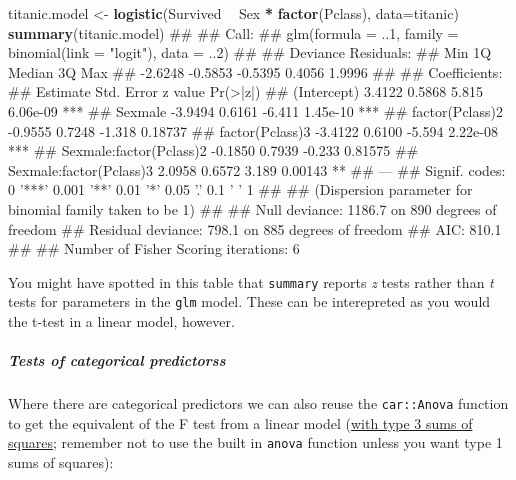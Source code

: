 \documentclass[]{article}
\newenvironment{Shaded}{\begin{snugshade}}{\end{snugshade}}
\newcommand{\KeywordTok}[1]{\textcolor[rgb]{0.13,0.29,0.53}{\textbf{#1}}}
\newcommand{\DataTypeTok}[1]{\textcolor[rgb]{0.13,0.29,0.53}{#1}}
\newcommand{\StringTok}[1]{\textcolor[rgb]{0.31,0.60,0.02}{#1}}
\newcommand{\OperatorTok}[1]{\textcolor[rgb]{0.81,0.36,0.00}{\textbf{#1}}}
\newcommand{\NormalTok}[1]{#1}
\let\oldsubparagraph\subparagraph
\renewcommand{\subparagraph}[1]{\oldsubparagraph{#1}\mbox{}}
\theoremstyle{definition}
\theoremstyle{definition}
\theoremstyle{definition}
\theoremstyle{remark}
\begin{document}
\begin{Shaded}
\begin{Highlighting}[]
\NormalTok{titanic.model <-}\StringTok{ }\KeywordTok{logistic}\NormalTok{(Survived }\OperatorTok{~}\StringTok{ }\NormalTok{Sex }\OperatorTok{*}\StringTok{ }\KeywordTok{factor}\NormalTok{(Pclass), }\DataTypeTok{data=}\NormalTok{titanic)}
\KeywordTok{summary}\NormalTok{(titanic.model)}
\NormalTok{## }
\NormalTok{## Call:}
\NormalTok{## glm(formula = ..1, family = binomial(link = "logit"), data = ..2)}
\NormalTok{## }
\NormalTok{## Deviance Residuals: }
\NormalTok{##     Min       1Q   Median       3Q      Max  }
\NormalTok{## -2.6248  -0.5853  -0.5395   0.4056   1.9996  }
\NormalTok{## }
\NormalTok{## Coefficients:}
\NormalTok{##                         Estimate Std. Error z value Pr(>|z|)    }
\NormalTok{## (Intercept)               3.4122     0.5868   5.815 6.06e-09 ***}
\NormalTok{## Sexmale                  -3.9494     0.6161  -6.411 1.45e-10 ***}
\NormalTok{## factor(Pclass)2          -0.9555     0.7248  -1.318  0.18737    }
\NormalTok{## factor(Pclass)3          -3.4122     0.6100  -5.594 2.22e-08 ***}
\NormalTok{## Sexmale:factor(Pclass)2  -0.1850     0.7939  -0.233  0.81575    }
\NormalTok{## Sexmale:factor(Pclass)3   2.0958     0.6572   3.189  0.00143 ** }
\NormalTok{## ---}
\NormalTok{## Signif. codes:  0 '***' 0.001 '**' 0.01 '*' 0.05 '.' 0.1 ' ' 1}
\NormalTok{## }
\NormalTok{## (Dispersion parameter for binomial family taken to be 1)}
\NormalTok{## }
\NormalTok{##     Null deviance: 1186.7  on 890  degrees of freedom}
\NormalTok{## Residual deviance:  798.1  on 885  degrees of freedom}
\NormalTok{## AIC: 810.1}
\NormalTok{## }
\NormalTok{## Number of Fisher Scoring iterations: 6}
\end{Highlighting}
\end{Shaded}

{You might have spotted in this table that \texttt{summary} reports
\emph{z} tests rather than \emph{t} tests for parameters in the
\texttt{glm} model. These can be interepreted as you would the t-test in
a linear model, however.}

\subparagraph{Tests of categorical
predictorss}\label{tests-of-categorical-predictorss}

Where there are categorical predictors we can also reuse the
\texttt{car::Anova} function to get the equivalent of the F test from a
linear model (\protect\hyperlink{sums-squares}{with type 3 sums of
squares}; remember not to use the built in \texttt{anova} function
unless you want type 1 sums of squares):
\end{document}
